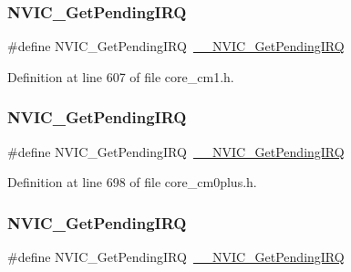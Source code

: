 \subsubsection{\texorpdfstring{N\+V\+I\+C\+\_\+\+Get\+Pending\+I\+RQ}{NVIC\_GetPendingIRQ}\hspace{0.1cm}{\footnotesize\ttfamily [2/13]}}
{\footnotesize\ttfamily \#define N\+V\+I\+C\+\_\+\+Get\+Pending\+I\+RQ~\hyperlink{group___c_m_s_i_s___core___n_v_i_c_functions_ga5a92ca5fa801ad7adb92be7257ab9694}{\+\_\+\+\_\+\+N\+V\+I\+C\+\_\+\+Get\+Pending\+I\+RQ}}



Definition at line 607 of file core\+\_\+cm1.\+h.

\mbox{\label{group___c_m_s_i_s___core___n_v_i_c_functions_gac608957a239466e9e0cbc30aa64feb3b}} 
\subsubsection{\texorpdfstring{N\+V\+I\+C\+\_\+\+Get\+Pending\+I\+RQ}{NVIC\_GetPendingIRQ}\hspace{0.1cm}{\footnotesize\ttfamily [3/13]}}
{\footnotesize\ttfamily \#define N\+V\+I\+C\+\_\+\+Get\+Pending\+I\+RQ~\hyperlink{group___c_m_s_i_s___core___n_v_i_c_functions_ga5a92ca5fa801ad7adb92be7257ab9694}{\+\_\+\+\_\+\+N\+V\+I\+C\+\_\+\+Get\+Pending\+I\+RQ}}



Definition at line 698 of file core\+\_\+cm0plus.\+h.

\mbox{\label{group___c_m_s_i_s___core___n_v_i_c_functions_gac608957a239466e9e0cbc30aa64feb3b}} 
\subsubsection{\texorpdfstring{N\+V\+I\+C\+\_\+\+Get\+Pending\+I\+RQ}{NVIC\_GetPendingIRQ}\hspace{0.1cm}{\footnotesize\ttfamily [4/13]}}
{\footnotesize\ttfamily \#define N\+V\+I\+C\+\_\+\+Get\+Pending\+I\+RQ~\hyperlink{group___c_m_s_i_s___core___n_v_i_c_functions_ga5a92ca5fa801ad7adb92be7257ab9694}{\+\_\+\+\_\+\+N\+V\+I\+C\+\_\+\+Get\+Pending\+I\+RQ}}



